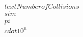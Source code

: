 \documentclass[preview]{standalone}
\begin{document}
\begin{align*}
\quad\\text{Number of Collisions} \quad\\sim \quad\\pi \quad\\cdot 10^n
\end{align*}
\end{document}

